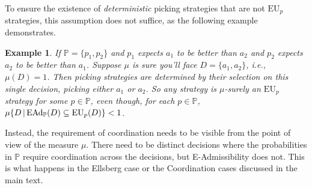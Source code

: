\documentclass[a4paper]{article}
\newtheorem{example}{Example}
\renewcommand\P{\mathbb{P}} %
\newcommand\EU{\mathrm{EU}}
\newcommand\EAd{\mathrm{EAd}}
\newcommand{\IP}{\P}
\newcommand\SetDelimiter[1][]{
	\nonscript\,#1\vert \allowbreak \nonscript\,\mathopen{}}
\providecommand\given{\SetDelimiter}
\newenvironment{CCM rewritten}
{\begingroup\color{blue}} %
{\endgroup}              %
\begin{document}
To ensure the existence of \emph{deterministic} picking strategies that are not $\EU_p$ strategies, this assumption does not suffice, as the following example demonstrates.
\begin{example}
	If $\IP=\{p_1,p_2\}$ and $p_1$ expects $a_1$ to be better than $a_2$ and $p_2$ expects $a_2$ to be better than $a_1$. Suppose $\mu$ is sure you'll face $D=\{a_1,a_2\}$, i.e., $\mu(D) = 1$. Then picking strategies are determined by their selection on this single decision, picking either $a_1$ or $a_2$. So any strategy is $\mu$-surely an $\EU_p$ strategy for some $p \in \IP$, even though, for each $p \in \IP$, $\mu\{D\given \EAd_\IP(D)\subseteq\EU_p(D)\}< 1$. 
\end{example}

Instead, the requirement of coordination needs to be visible from the point of view of the measure $\mu$. There need to be distinct decisions where the probabilities in $\IP$  require coordination across the decisions, but E-Admissibility does not. This is what happens in the Ellsberg case or the Coordination cases discussed in the main text. 
\end{document}
